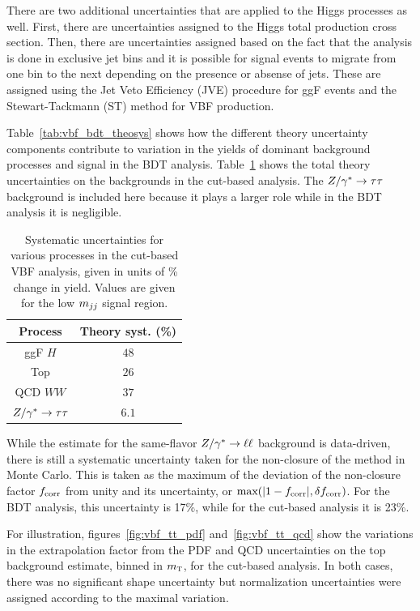 There are two additional uncertainties that are applied to the Higgs processes as well. First, there are uncertainties assigned to the Higgs total production cross section. Then, there are uncertainties assigned based on the fact that the analysis is done in exclusive jet bins and it is possible for signal events to migrate from one bin to the next depending on the presence or absense of jets. These are assigned using the Jet Veto Efficiency (JVE) procedure\cite{JVE} for ggF events and the Stewart-Tackmann (ST) method\cite{ST} for VBF production. 

Table~\ref{tab:vbf_bdt_theosys} shows how the different theory uncertainty components contribute to variation in the yields of dominant background processes and signal in the BDT analysis. Table~\ref{tab:vbf_cb_theosys} shows the total theory uncertainties on the backgrounds in the cut-based analysis. The $Z/\gamma^{\ast} \to\tau\tau$ background is included here because it plays a larger role while in the BDT analysis it is negligible. 

\begin{table}[h!]
\centering
\captionsetup{justification=centering}
\begin{tabular}{|c|c|}
\hline
Process & Theory syst. (\%)  \\ \hline
ggF $H$ & $48$ \\ \hline
Top & $26$ \\ \hline
QCD $WW$ & $37$ \\ \hline
$Z/\gamma^{\ast} \to \tau\tau$ & $6.1$ \\ \hline
\end{tabular}
\caption{Systematic uncertainties for various processes in the cut-based VBF analysis, given in units of \% change in yield. Values are given for the low $m_{jj}$ signal region.}
\label{tab:vbf_cb_theosys}
\end{table}

While the estimate for the same-flavor $Z/\gamma^{\ast}\to\ell\ell$ background is data-driven, there is still a systematic uncertainty taken for the non-closure of the method in Monte Carlo. This is taken as the maximum of the deviation of the non-closure factor $f_{\rm corr}$ from unity and its uncertainty, or $\textrm{max}(|1 - f_{\rm corr}|, \delta f_{\rm corr})$. For the BDT analysis, this uncertainty is 17\%, while for the cut-based analysis it is 23\%.

For illustration, figures~\ref{fig:vbf_tt_pdf} and~\ref{fig:vbf_tt_qcd} show the variations in the extrapolation factor from the PDF and QCD uncertainties on the top background estimate, binned in $m_{\textrm{\footnotesize\sc t}}$, for the cut-based analysis. In both cases, there was no significant shape uncertainty but normalization uncertainties were assigned according to the maximal variation. 

